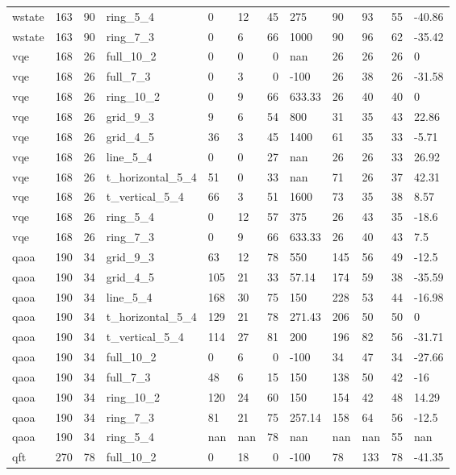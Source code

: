 \begin{longtable}{lrrlllrlllrl}
wstate & 163 & 90 & ring\_5\_4 & 0 & 12 & 45 & 275 & 90 & 93 & 55 & -40.86 \\
wstate & 163 & 90 & ring\_7\_3 & 0 & 6 & 66 & 1000 & 90 & 96 & 62 & -35.42 \\
vqe & 168 & 26 & full\_10\_2 & 0 & 0 & 0 & nan & 26 & 26 & 26 & 0 \\
vqe & 168 & 26 & full\_7\_3 & 0 & 3 & 0 & -100 & 26 & 38 & 26 & -31.58 \\
vqe & 168 & 26 & ring\_10\_2 & 0 & 9 & 66 & 633.33 & 26 & 40 & 40 & 0 \\
vqe & 168 & 26 & grid\_9\_3 & 9 & 6 & 54 & 800 & 31 & 35 & 43 & 22.86 \\
vqe & 168 & 26 & grid\_4\_5 & 36 & 3 & 45 & 1400 & 61 & 35 & 33 & -5.71 \\
vqe & 168 & 26 & line\_5\_4 & 0 & 0 & 27 & nan & 26 & 26 & 33 & 26.92 \\
vqe & 168 & 26 & t\_horizontal\_5\_4 & 51 & 0 & 33 & nan & 71 & 26 & 37 & 42.31 \\
vqe & 168 & 26 & t\_vertical\_5\_4 & 66 & 3 & 51 & 1600 & 73 & 35 & 38 & 8.57 \\
vqe & 168 & 26 & ring\_5\_4 & 0 & 12 & 57 & 375 & 26 & 43 & 35 & -18.6 \\
vqe & 168 & 26 & ring\_7\_3 & 0 & 9 & 66 & 633.33 & 26 & 40 & 43 & 7.5 \\
qaoa & 190 & 34 & grid\_9\_3 & 63 & 12 & 78 & 550 & 145 & 56 & 49 & -12.5 \\
qaoa & 190 & 34 & grid\_4\_5 & 105 & 21 & 33 & 57.14 & 174 & 59 & 38 & -35.59 \\
qaoa & 190 & 34 & line\_5\_4 & 168 & 30 & 75 & 150 & 228 & 53 & 44 & -16.98 \\
qaoa & 190 & 34 & t\_horizontal\_5\_4 & 129 & 21 & 78 & 271.43 & 206 & 50 & 50 & 0 \\
qaoa & 190 & 34 & t\_vertical\_5\_4 & 114 & 27 & 81 & 200 & 196 & 82 & 56 & -31.71 \\
qaoa & 190 & 34 & full\_10\_2 & 0 & 6 & 0 & -100 & 34 & 47 & 34 & -27.66 \\
qaoa & 190 & 34 & full\_7\_3 & 48 & 6 & 15 & 150 & 138 & 50 & 42 & -16 \\
qaoa & 190 & 34 & ring\_10\_2 & 120 & 24 & 60 & 150 & 154 & 42 & 48 & 14.29 \\
qaoa & 190 & 34 & ring\_7\_3 & 81 & 21 & 75 & 257.14 & 158 & 64 & 56 & -12.5 \\
qaoa & 190 & 34 & ring\_5\_4 & nan & nan & 78 & nan & nan & nan & 55 & nan \\
qft & 270 & 78 & full\_10\_2 & 0 & 18 & 0 & -100 & 78 & 133 & 78 & -41.35 \\

\end{longtable}

